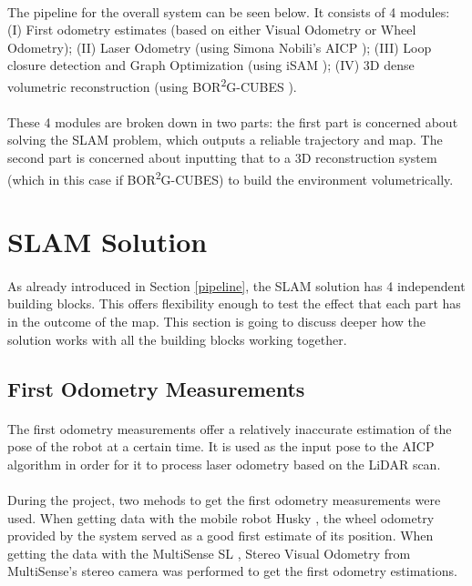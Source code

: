 \documentclass[11pt]{article}
\begin{document}
	\paragraph{}
	The pipeline for the overall system can be seen below. It consists of 4 modules: (I) First odometry estimates (based on either Visual Odometry or Wheel Odometry); (II) Laser Odometry (using Simona Nobili's AICP \cite{7989547}); (III) Loop closure detection and Graph Optimization (using iSAM \cite{Kaess08tro}); (IV) 3D dense volumetric reconstruction (using BOR\textsuperscript{2}G-CUBES \cite{TannerFSR2015}\cite{TannerArXiv2016}).

	\paragraph{}
	These 4 modules are broken down in two parts: the first part is concerned about solving the SLAM problem, which outputs a reliable trajectory and map. The second part is concerned about inputting that to a 3D reconstruction system (which in this case if BOR\textsuperscript{2}G-CUBES) to build the environment volumetrically.

	\newpage
	\section{SLAM Solution}
	\paragraph{}
	As already introduced in Section \ref{pipeline}, the SLAM solution has 4 independent building blocks. This offers flexibility enough to test the effect that each part has in the outcome of the map. This section is going to discuss deeper how the solution works with all the building blocks working together. 
	 
	\subsection{First Odometry Measurements}
	\paragraph{}
	The first odometry measurements offer a relatively inaccurate estimation of the pose of the robot at a certain time. It is used as the input pose to the AICP algorithm in order for it to process laser odometry based on the LiDAR scan.
	
	\paragraph{}
	During the project, two mehods to get the first odometry measurements were used. When getting data with the mobile robot Husky \cite{Husky}, the wheel odometry provided by the system served as a good first estimate of its position. When getting the data with the MultiSense SL \cite{multisense}, Stereo Visual Odometry from MultiSense's stereo camera was performed to get the first odometry estimations.
\end{document}
